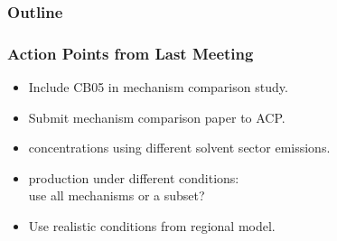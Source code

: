 \begin{frame}
    \frametitle{Outline} 
    \tableofcontents[currentsection]
\end{frame} 

\begin{frame}
    \frametitle{Action Points from Last Meeting}

    \vspace{-4mm}
    \begin{itemize}
        \item Include CB05 in mechanism comparison study. \Checkmark \vspace{3mm}
        \item Submit mechanism comparison paper to ACP. \vspace{3mm}
        \item {} concentrations using different solvent sector emissions. \Checkmark \vspace{3mm}
        \item {} production under different conditions:\\use all mechanisms or a subset?\vspace{3mm}
        \item Use realistic conditions from regional model. 
    \end{itemize} 
\end{frame} 
